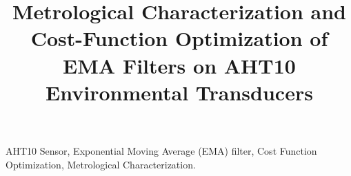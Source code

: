 \documentclass[conference]{IEEEtran}
\begin{document}
\title{Metrological Characterization and Cost-Function Optimization of EMA Filters on AHT10 Environmental Transducers
}

\author{
}

\maketitle



\begin{IEEEkeywords}
AHT10 Sensor, Exponential Moving Average (EMA) filter, Cost Function Optimization, Metrological Characterization.
\end{IEEEkeywords}











\end{document}
